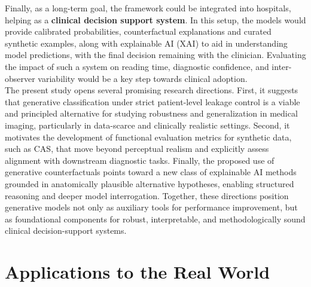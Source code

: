 Finally, as a long-term goal, the framework could be integrated into hospitals, helping as a \textbf{clinical decision support system}. In this setup, the models would provide calibrated probabilities, counterfactual explanations and curated synthetic examples, along with explainable AI (XAI) to aid in understanding model predictions, with the final decision remaining with the clinician. Evaluating the impact of such a system on reading time, diagnostic confidence, and inter-observer variability would be a key step towards clinical adoption.\\

The present study opens several promising research directions. First, it suggests that generative classification under strict patient-level leakage control is a viable and principled alternative for studying robustness and generalization in medical imaging, particularly in data-scarce and clinically realistic settings. Second, it motivates the development of functional evaluation metrics for synthetic data, such as CAS, that move beyond perceptual realism and explicitly assess alignment with downstream diagnostic tasks. Finally, the proposed use of generative counterfactuals points toward a new class of explainable AI methods grounded in anatomically plausible alternative hypotheses, enabling structured reasoning and deeper model interrogation. Together, these directions position generative models not only as auxiliary tools for performance improvement, but as foundational components for robust, interpretable, and methodologically sound clinical decision-support systems.


\section{Applications to the Real World}

